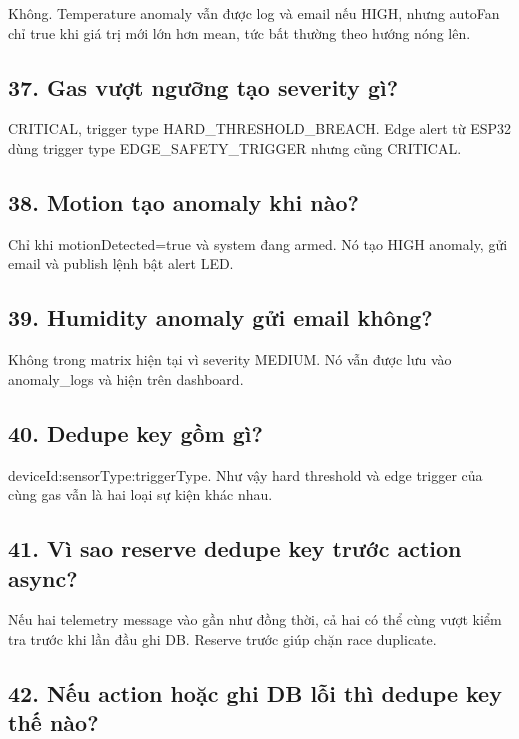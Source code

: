 \documentclass[11pt,oneside,openany]{book}
\renewcommand{\texttt}[1]{{\ttfamily\small #1}}
\begin{document}
Không. Temperature anomaly vẫn được log và email nếu HIGH, nhưng
\texttt{autoFan} chỉ true khi giá trị mới lớn hơn mean, tức bất thường
theo hướng nóng lên.

\subsection{37. Gas vượt ngưỡng tạo severity
gì?}\label{37-gas-vux1b0ux1ee3t-ngux1b0ux1ee1ng-tux1ea1o-severity-guxec}

CRITICAL, trigger type \texttt{HARD\_THRESHOLD\_BREACH}. Edge alert từ
ESP32 dùng trigger type \texttt{EDGE\_SAFETY\_TRIGGER} nhưng cũng
CRITICAL.

\subsection{38. Motion tạo anomaly khi
nào?}\label{38-motion-tux1ea1o-anomaly-khi-nuxe0o}

Chỉ khi \texttt{motionDetected=true} và system đang armed. Nó tạo HIGH
anomaly, gửi email và publish lệnh bật alert LED.

\subsection{39. Humidity anomaly gửi email
không?}\label{39-humidity-anomaly-gux1eedi-email-khuxf4ng}

Không trong matrix hiện tại vì severity MEDIUM. Nó vẫn được lưu vào
\texttt{anomaly\_logs} và hiện trên dashboard.

\subsection{40. Dedupe key gồm gì?}\label{40-dedupe-key-gux1ed3m-guxec}

\texttt{deviceId:sensorType:triggerType}. Như vậy hard threshold và edge
trigger của cùng gas vẫn là hai loại sự kiện khác nhau.

\subsection{41. Vì sao reserve dedupe key trước action
async?}\label{41-vuxec-sao-reserve-dedupe-key-trux1b0ux1edbc-action-async}

Nếu hai telemetry message vào gần như đồng thời, cả hai có thể cùng vượt
kiểm tra trước khi lần đầu ghi DB. Reserve trước giúp chặn race
duplicate.

\subsection{42. Nếu action hoặc ghi DB lỗi thì dedupe key thế
nào?}\label{42-nux1ebfu-action-houx1eb7c-ghi-db-lux1ed7i-thuxec-dedupe-key-thux1ebf-nuxe0o}
\end{document}
